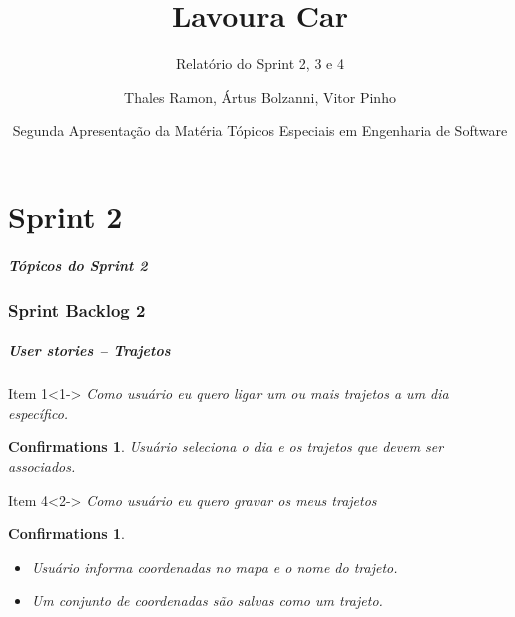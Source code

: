 \documentclass[hyperref={pdfpagelabels=false},11pt]{beamer}
\author{Thales Ramon, Ártus Bolzanni, Vitor Pinho}
\title{Lavoura Car}
\subtitle{Relatório do Sprint 2, 3 e  4}
\date[UNEB-SI 2010.2]{Segunda Apresentação da Matéria Tópicos Especiais em Engenharia de Software}
\institute[UNEB]{Universidade Estadual da Bahia}
\newtheorem{confirmations}[theorem]{Confirmations}
\begin{document}
	\begin{frame}
		\titlepage
	\end{frame}
	
	\part{Sprint 2}
		\begin{frame}
			\frametitle{Tópicos do Sprint 2}
			\tableofcontents[pausesections]
		\end{frame}
		
		\section{Sprint Backlog 2}
	
			\begin{frame}
				\frametitle{User stories -- Trajetos}
				\begin{block}{Item 1}<1->
					\emph{Como usuário eu quero ligar um ou mais trajetos a um dia específico.}
				\begin{confirmations}
						{Usuário seleciona o dia e os trajetos que devem ser associados.}
				\end{confirmations}	

				\end{block}
				\begin{block}{Item 4}<2->
					\emph{Como usuário eu quero gravar os meus trajetos}
					\begin{confirmations}
						\begin{itemize}
							\item Usuário informa coordenadas no mapa e o nome do trajeto.
							\item Um conjunto de coordenadas são salvas como um trajeto.
						\end{itemize}
					\end{confirmations}
				\end{block} 								
			\end{frame}
			
\end{document}
